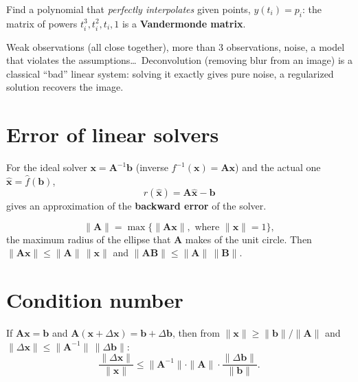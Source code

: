 \documentclass[11pt,a4paper,openany]{book}
\begin{document}
\begin{defnbox}[title=Polynomial regression and Vandermonde matrix]
Find a polynomial that \emph{perfectly interpolates} given points, $y(t_i) = p_i$: the matrix of
powers $t_i^3, t_i^2, t_i, 1$ is a \textbf{Vandermonde matrix}.
\end{defnbox}

\begin{warnbox}[title=What could go wrong?]
Weak observations (all close together), more than 3 observations, noise, a model that violates
the assumptions\dots\ Deconvolution (removing blur from an image) is a classical ``bad'' linear
system: solving it exactly gives pure noise, a regularized solution recovers the image.
\end{warnbox}


\section{Error of linear solvers}

\begin{defnbox}[title=Residual]
For the ideal solver $\mathbf{x} = \mathbf{A}^{-1}\mathbf{b}$ (inverse $f^{-1}(\mathbf{x}) =
\mathbf{A}\mathbf{x}$) and the actual one $\hat{\mathbf{x}} = \hat{f}(\mathbf{b})$,
\[
r(\hat{\mathbf{x}}) = \mathbf{A}\hat{\mathbf{x}} - \mathbf{b}
\]
gives an approximation of the \textbf{backward error} of the solver.
\end{defnbox}

\begin{defnbox}[title=Matrix norm (operator norm)]
\[
\|\mathbf{A}\| = \max\{\|\mathbf{A}\mathbf{x}\|, \text{ where } \|\mathbf{x}\| = 1\},
\]
the maximum radius of the ellipse that $\mathbf{A}$ makes of the unit circle. Then
$\|\mathbf{A}\mathbf{x}\| \le \|\mathbf{A}\|\,\|\mathbf{x}\|$ and
$\|\mathbf{A}\mathbf{B}\| \le \|\mathbf{A}\|\,\|\mathbf{B}\|$.
\end{defnbox}


\section{Condition number}

\begin{thmbox}[title=Perturbed linear system]
If $\mathbf{A}\mathbf{x} = \mathbf{b}$ and $\mathbf{A}(\mathbf{x} + \Delta\mathbf{x}) =
\mathbf{b} + \Delta\mathbf{b}$, then from $\|\mathbf{x}\| \ge \|\mathbf{b}\|/\|\mathbf{A}\|$ and
$\|\Delta\mathbf{x}\| \le \|\mathbf{A}^{-1}\|\,\|\Delta\mathbf{b}\|$:
\[
\frac{\|\Delta\mathbf{x}\|}{\|\mathbf{x}\|} \le
\|\mathbf{A}^{-1}\| \cdot \|\mathbf{A}\| \cdot \frac{\|\Delta\mathbf{b}\|}{\|\mathbf{b}\|}.
\]
\end{thmbox}
\end{document}
